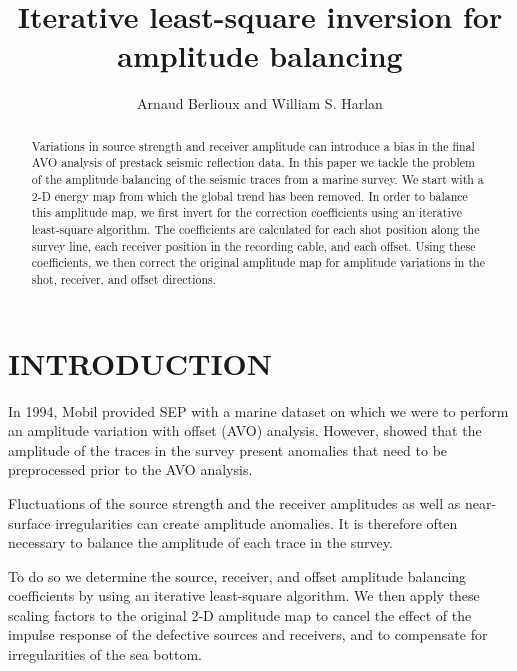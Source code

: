 

\title{Iterative least-square inversion for amplitude balancing}
\author{Arnaud Berlioux and William S. Harlan} 

\maketitle


\begin{abstract}
	Variations in source strength and receiver amplitude can introduce
	a bias in the final AVO analysis of prestack seismic reflection data.
	In this paper we tackle the problem of the amplitude balancing of
	the seismic traces from a marine survey. We start with a 2-D energy
	map from which the global trend has been removed. In order to balance 
	this amplitude map, we first invert for the correction coefficients 
	using an iterative least-square algorithm. The coefficients are 
	calculated for each shot position along the survey line, each receiver 
	position in the recording cable, and each offset. Using these 
	coefficients, we then correct the original amplitude map for amplitude 
	variations in the shot, receiver, and offset directions.
\end{abstract}


\section{INTRODUCTION}
\par
In 1994, Mobil provided SEP with a marine dataset on which we were to
perform an amplitude variation with offset (AVO)
analysis. However, \cite{Berlioux.sep.80.349} showed that the
amplitude of the traces in the survey present anomalies that need to
be preprocessed prior to the AVO analysis.

\par
Fluctuations of the source strength and the receiver amplitudes as well
as near-surface irregularities can create amplitude anomalies. It is
therefore often necessary to balance the amplitude of each trace in the survey.

\par
To do so we determine the source, receiver, and offset amplitude balancing
coefficients by using an iterative least-square algorithm. We then apply these
scaling factors to the original 2-D amplitude map to cancel the effect of the 
impulse response of the defective sources and receivers, and to compensate for 
irregularities of the sea bottom.

